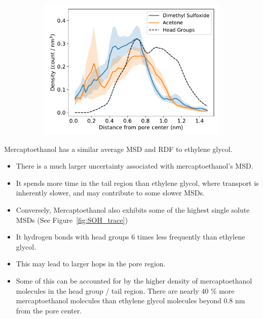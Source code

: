 \documentclass{article}
\begin{document}
\begin{figure}
\begin{subfigure}{0.325\linewidth}
  \includegraphics[width=\textwidth]{thiol_comparison_DMS.pdf}
  \caption{}\label{fig:DMP_GLY_comparison}
  \end{subfigure}
  \caption{}\label{fig:sulfur_analog_rdfs}
  \end{figure}
  
  \noindent Mercaptoethanol has a similar average MSD and RDF to ethylene glycol.
  \begin{itemize}
    \item There is a much larger uncertainty associated with mercaptoethanol's MSD.
    \item It spends more time in the tail region than
    ethylene glycol, where transport is inherently slower, and may contribute to some
    slower MSDs.  %
    \item Conversely, Mercaptoethanol also exhibits some of the highest single solute MSDs 
    (See Figure~\ref{fig:SOH_trace})  %
    \item It hydrogen bonds with head groups 6 times less frequently than ethylene glycol.
    \item This may lead to larger hops in the pore region.
    \item Some of this can be accounted for by the higher density of mercaptoethanol 
    molecules in the head group / tail region. There are nearly 40 \% more mercaptoethanol
    molecules than ethylene glycol molecules beyond 0.8 nm from the pore center. 
  \end{itemize}
  
\end{document}
